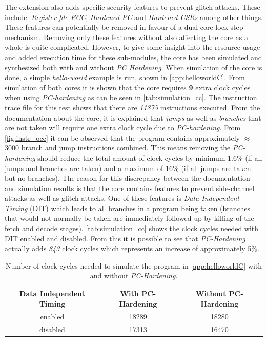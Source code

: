 The extension also adds specific security features to prevent glitch attacks. These include: \textit{Register file ECC}, \textit{Hardened PC} and \textit{Hardened CSRs} among other things. These features can potentially be removed in favour of a dual core lock-step mechanism. Removing only these features without also affecting the core as a whole is quite complicated. However, to give some insight into the resource usage and added execution time for these sub-modules, the core has been simulated and synthesized both with and without \textit{PC Hardening}. When simulation of the core is done, a simple \textit{hello-world} example is run, shown in \autoref{app:helloworldC}. From simulation of both cores it is shown that the core requires \textbf{9} extra clock cycles when using \textit{PC-hardening} as can be seen in \autoref{tab:simulation_cc}. The instruction trace file for this test shows that there are \textit{11875} instructions executed. From the documentation about the core, it is explained that \textit{jumps} as well as \textit{branches} that are not taken will require one extra clock cycle due to \textit{PC-hardening}. From \autoref{fig:instr_occ} it can be observed that the program contains approximately $\approx$ 3000 branch and jump instructions combined. This means removing the \textit{PC-hardening} should reduce the total amount of clock cycles by minimum 1.6\% (if all jumps and branches are taken) and a maximum of 16\% (if all jumps are taken but no branches). 
The reason for this discrepancy between the documentation and simulation results is that the core contains features to prevent side-channel attacks as well as glitch attacks. One of these features is \textit{Data Independent Timing} (DIT) which leads to all branches in a program being taken (branches that would not normally be taken are immediately followed up by killing of the fetch and decode stages). \autoref{tab:simulation_cc} shows the clock cycles needed with DIT enabled and disabled. From this it is possible to see that \textit{PC-Hardening} actually adds \textit{843} clock cycles which represents an increase of approximately 5\%. 

\begin{table}[h]
\centering
\caption{Number of clock cycles needed to simulate the program in \autoref{app:helloworldC} with and without \textit{PC-Hardening}.}
\label{tab:simulation_cc}
\begin{tabular}{c|cc}
\toprule 
Data Independent Timing & With PC-Hardening & Without PC-Hardening \\
\midrule
\rowcolor{black!20} enabled & 18289 & 18280 \\
disabled & 17313 & 16470 \\
\bottomrule
\end{tabular}
\end{table}

